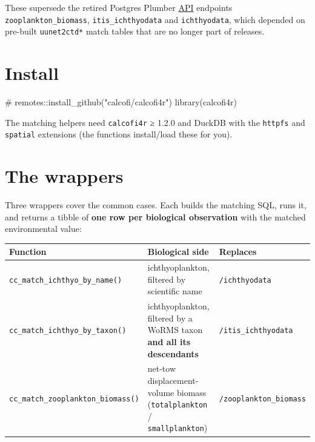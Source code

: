 \documentclass[
  letterpaper,
  DIV=11,
  numbers=noendperiod]{scrreprt}
\newenvironment{Shaded}{\begin{snugshade}}{\end{snugshade}}
\newcommand{\CommentTok}[1]{\textcolor[rgb]{0.37,0.37,0.37}{#1}}
\newcommand{\FunctionTok}[1]{\textcolor[rgb]{0.28,0.35,0.67}{#1}}
\newcommand{\NormalTok}[1]{\textcolor[rgb]{0.00,0.23,0.31}{#1}}
\begin{document}
These supersede the retired Postgres Plumber \href{api.qmd}{API}
endpoints \texttt{zooplankton\_biomass}, \texttt{itis\_ichthyodata} and
\texttt{ichthyodata}, which depended on pre-built \texttt{uunet2ctd*}
match tables that are no longer part of releases.

\section{Install}\label{install}

\begin{Shaded}
\begin{Highlighting}[]
\CommentTok{\# remotes::install\_github("calcofi/calcofi4r")}
\FunctionTok{library}\NormalTok{(calcofi4r)}
\end{Highlighting}
\end{Shaded}

The matching helpers need \texttt{calcofi4r} ≥ 1.2.0 and DuckDB with the
\texttt{httpfs} and \texttt{spatial} extensions (the functions
install/load these for you).

\section{The wrappers}\label{the-wrappers}

Three wrappers cover the common cases. Each builds the matching SQL,
runs it, and returns a tibble of \textbf{one row per biological
observation} with the matched environmental value:

\begin{longtable}[]{@{}
  >{\raggedright\arraybackslash}p{}
  >{\raggedright\arraybackslash}p{}
  >{\raggedright\arraybackslash}p{}@{}}
\toprule\noalign{}
\begin{minipage}[b]{\linewidth}\raggedright
Function
\end{minipage} & \begin{minipage}[b]{\linewidth}\raggedright
Biological side
\end{minipage} & \begin{minipage}[b]{\linewidth}\raggedright
Replaces
\end{minipage} \\
\midrule\noalign{}
\endhead
\bottomrule\noalign{}
\endlastfoot
\texttt{cc\_match\_ichthyo\_by\_name()} & ichthyoplankton, filtered by
scientific name & \texttt{/ichthyodata} \\
\texttt{cc\_match\_ichthyo\_by\_taxon()} & ichthyoplankton, filtered by
a WoRMS taxon \textbf{and all its descendants} &
\texttt{/itis\_ichthyodata} \\
\texttt{cc\_match\_zooplankton\_biomass()} & net-tow displacement-volume
biomass (\texttt{totalplankton} / \texttt{smallplankton}) &
\texttt{/zooplankton\_biomass} \\
\end{longtable}
\end{document}

